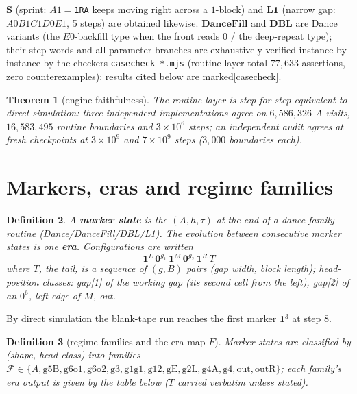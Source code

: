 \documentclass[11pt]{amsart}
\newtheorem{theorem}{Theorem}[section]
\newtheorem{definition}[theorem]{Definition}
\begin{document}
$\mathbf S$ (sprint: $A1=$\texttt{1RA} keeps moving right across a $1$-block) and $\mathbf{L1}$ (narrow gap: $A0B1C1D0E1$, 5 steps) are obtained likewise. $\mathbf{DanceFill}$ and $\mathbf{DBL}$ are Dance variants (the $E0$-backfill type when the front reads $0$ / the deep-repeat type); their step words and all parameter branches are exhaustively verified instance-by-instance by the checkers \texttt{casecheck-*.mjs} (routine-layer total $77{,}633$ assertions, zero counterexamples); results cited below are marked[casecheck].

\begin{theorem}[engine faithfulness]\label{lem:faith}
The routine layer is step-for-step equivalent to direct simulation: three independent implementations agree on $6{,}586{,}326$ $A$-visits, $16{,}583{,}495$ routine boundaries and $3{\times}10^6$ steps; an independent audit agrees at fresh checkpoints at $3\times10^9$ and $7\times10^9$ steps ($3{,}000$ boundaries each).
\end{theorem}

\section{Markers, eras and regime families}

\begin{definition}
A \textbf{marker state} is the $(A,h,\tau)$ at the end of a dance-family routine (Dance/DanceFill/DBL/L1). The evolution between consecutive marker states is one \textbf{era}. Configurations are written
\[
\mathbf{1}^L\,\mathbf 0^{g_1}\,\mathbf 1^M\,\mathbf 0^{g_2}\,\mathbf 1^R\,T
\]
where $T$, the tail, is a sequence of $(g,B)$ pairs (gap width, block length); head-position classes: gap[1] of the working gap (its second cell from the left), gap[2] of an $0^6$, left edge of $M$, out.
\end{definition}

By direct simulation the blank-tape run reaches the first marker $\mathbf 1^3$ at step 8.

\begin{definition}[regime families and the era map $F$]
Marker states are classified by (shape, head class) into families $\mathcal F\in\{A,\mathrm{g5B},\mathrm{g6o1},\mathrm{g6o2},\mathrm{g3},\mathrm{g1g1},\mathrm{g12},\mathrm{gE},\mathrm{g2L},\mathrm{g4A},\mathrm{g4},\mathrm{out},\mathrm{outR}\}$; each family's era output is given by the table below ($T$ carried verbatim unless stated).
\end{definition}
\end{document}
